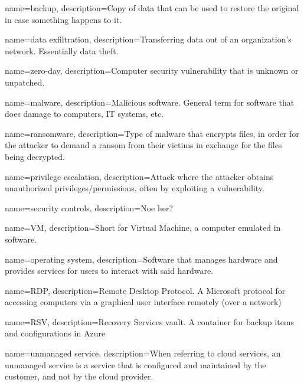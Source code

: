

\makeglossaries %

{
        name=backup,
        description={Copy of data that can be used to restore the original in case something happens to it.}
}

{
        name=data exfiltration,
        description={Transferring data out of an organization's network. Essentially data theft.}
}

{
        name=zero-day,
        description={Computer security vulnerability that is unknown or unpatched.}
}

{
        name=malware,
        description={Malicious software. General term for software that does damage to computers, IT systems, etc.}
}

{
        name=ransomware,
        description={Type of malware that encrypts files, in order for the attacker to demand a ransom from their victims in exchange for the files being decrypted.}
}

{
        name=privilege escalation,
        description={Attack where the attacker obtains unauthorized privileges/permissions, often by exploiting a vulnerability.}
}

{
        name=security controls,
        description={Noe her?}
}


{
        name=VM,
        description={Short for Virtual Machine, a computer emulated in software.}
}

{
        name=operating system,
        description={Software that manages hardware and provides services for users to interact with said hardware.}
}

{
        name=RDP,
        description={Remote Desktop Protocol. A Microsoft protocol for accessing computers via a graphical user interface remotely (over a network)}
}

{
        name=RSV,
        description={Recovery Services vault. A container for backup items and configurations in Azure}
}

{
        name=unmanaged service,
        description={When referring to cloud services, an unmanaged service is a service that is configured and maintained by the customer, and not by the cloud provider.}
}


